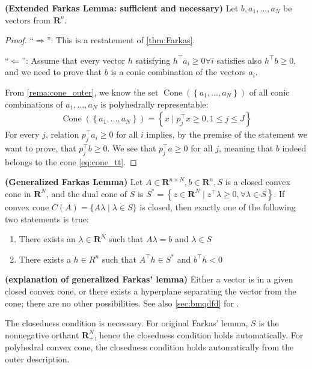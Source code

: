 \documentclass{article}
\newcommand{\bfs}[1]{\textbf{({#1}) }}
\newcommand{\Cone}{\operatorname{Cone}}
\begin{document}
\begin{cora}{\bfs{Extended Farkas Lemma: sufficient and necessary}}\label{cora:Farkas}
 Let $b, a_{1}, \ldots, a_{N}$ be vectors from $\mathbf{R}^{n}$. 
 
 \centerline{}
 \end{cora}
\begin{proof}\color{ForestGreen}
``$\Rightarrow$'': This is a restatement of \cref{thm:Farkas}. 

``$\Leftarrow$'': Assume that every vector $h$ satisfying $h^{\top} a_{i} \geq 0 \forall i$ satisfies also $h^{\top} b \geq 0$, and we need to prove that $b$ is a conic combination of the vectors $a_{i}$.

From \cref{rema:cone_outer}, we know the set $\Cone(\left\{a_{1}, \ldots, a_{N}\right\})$ of all conic combinations of $a_{1}, \ldots, a_{N}$ is polyhedrally representable:
\begin{align}
\Cone(\left\{a_{1}, \ldots, a_{N}\right\})=\left\{x \mid p_{j}^{\top} x \geq 0, 1 \leq j \leq J\right\}\label{eq:cone_tt}
\end{align}
 For every $j$, relation $p_{j}^{\top} a_{i} \geq 0$ for all $i$ implies, by the premise of the statement we want to prove, that $p_{j}^{\top} b \geq 0$. We see that $p_{j}^{\top} a \geq 0$ for all $j$, meaning that $b$ indeed belongs to the cone \cref{eq:cone_tt}.
\end{proof}
\begin{cora}{\bfs{Generalized Farkas Lemma}}\label{cora:gene_fark}
Let $A \in \mathbf{R}^{n \times N}, b \in \mathbf{R}^{n}, S$ is a closed convex cone in $\mathbf{R}^{N}$, and the dual cone of $S$ is $S^{*}=\left\{z \in \mathbf{R}^{N} \mid z^{\top} \lambda \geq 0, \forall \lambda \in S\right\}$. If convex cone $C(A)=\{{A \lambda} \mid \lambda \in S\}$ is closed, then exactly one of the following two statements is true:
\begin{enumerate}
    \item There exists an $\lambda \in \mathbf{R}^{N}$ such that ${A \lambda}=b$ and $\lambda \in S$
    \item There exists a ${h} \in {R}^{n}$ such that $A^{\top} {h} \in S^{*}$ and $b^{\top} {h}<0$
\end{enumerate}
\end{cora}
\begin{rema}{\bfs{explanation of generalized Farkas' lemma}}
Either a vector is in a given closed convex cone, or there exists a hyperplane separating the vector from the cone; there are no other possibilities.  See also \cref{sec:bmqdfd} for .

The closedness condition is necessary. For original Farkas' lemma, $S$ is the nonnegative orthant $\mathbf{R}_{+}^{N}$, hence the closedness condition holds automatically. For polyhedral convex cone, the closedness condition holds automatically from the outer description.
\end{rema}
\end{document}
